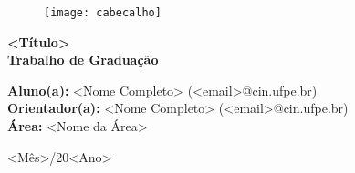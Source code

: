 
\begin{figure}[h]
	\centering
	\texttt{[image: cabecalho]}
\end{figure}

\vspace{3cm}
\begin{center}
	\huge{\textbf{<Título>}}\\[2ex]
	\large{\textbf{Trabalho de Graduação}}
\end{center}

\vspace{4cm}
\begin{center}
    \textbf{Aluno(a):} <Nome Completo> (<email>@cin.ufpe.br) \\
    \textbf{Orientador(a):} <Nome Completo> (<email>@cin.ufpe.br) \\
    \textbf{Área:} <Nome da Área>
\end{center}

\vspace{6cm}
\begin{center}
    <Mês>/20<Ano>
\end{center}

\pagestyle{empty}
